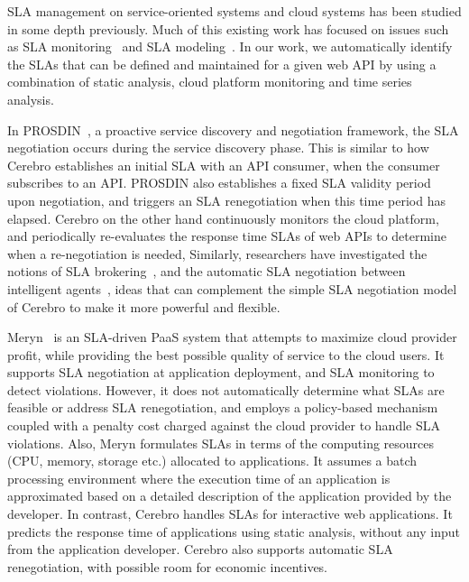 SLA management on service-oriented systems and cloud systems has been 
studied in some depth previously.
Much of this existing work has focused on issues 
such as SLA monitoring~\cite{Michlmayr:2009:CQM:1657755.1657756,Tripathy:2011:MMS:1980822.1980832,Raimondi:2008:EOM:1453101.1453125,Bertolino:2007:SUS:1294904.1294914} and SLA modeling~\cite{Chau:2008:ASM:1463788.1463802,Stamou:2013:SGM:2516588.2516592,Skene:2004:PSL:998675.999422}. 
In our work, we automatically identify the SLAs that can be defined and
maintained 
for a given web API by using a combination of
static analysis, cloud platform monitoring and time series analysis.  

In PROSDIN~\cite{Mahbub:2011:PSN:2061042.2062022}, a proactive service discovery and negotiation
framework, the SLA negotiation occurs during the service discovery phase. This is similar to how
Cerebro establishes an initial SLA with an API consumer, when the consumer subscribes to an API. PROSDIN also
establishes a fixed SLA validity period upon negotiation, and triggers an SLA renegotiation when this time period has 
elapsed. Cerebro on the other hand continuously monitors the cloud platform,
and periodically re-evaluates the response time SLAs of web APIs 
to determine when a re-negotiation is needed,
Similarly, researchers have investigated the notions of SLA brokering~\cite{6546098}, and the automatic SLA negotiation
between intelligent agents~\cite{Yaqub:2014:ONS:2680847.2681496}, ideas that can complement the
simple SLA negotiation model of Cerebro to make it more powerful and flexible.

Meryn~\cite{Dib:2013:MOS:2465823.2465825} is an SLA-driven PaaS system that attempts to maximize cloud
provider profit, while providing the best possible quality of service to the cloud users. It supports
SLA negotiation at application deployment, and SLA monitoring to detect
violations. However, it does not automatically determine what SLAs are
feasible or address SLA renegotiation, 
and employs a policy-based mechanism coupled
with a penalty cost charged against the cloud provider to
handle SLA violations. Also, Meryn formulates SLAs in terms of the computing resources (CPU, memory,
storage etc.) allocated to applications. It assumes a batch processing environment where the
execution time of an application is approximated based on a detailed description of the application provided
by the developer. In contrast, Cerebro handles SLAs for interactive web applications. It predicts
the response time of applications using static analysis, without any input from the application developer. 
Cerebro also supports automatic SLA renegotiation, with possible room for economic incentives.

